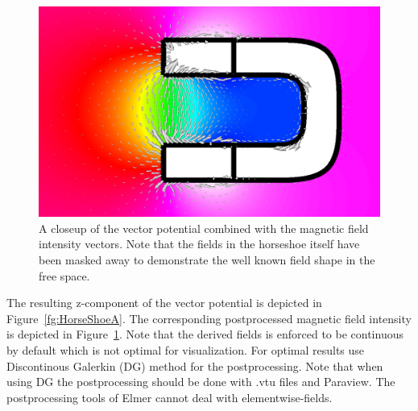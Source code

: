 \begin{figure}[h]
\centering
\includegraphics[width=120 mm]{HorseShoeB}
\caption{A closeup of the vector potential combined with the magnetic field intensity vectors. 
Note that the fields in the horseshoe itself have been
masked away to demonstrate the well known field shape in the free space.}\label{fg:HorseShoeB}
\end{figure}  


The resulting z-component of the vector potential is depicted in Figure~\ref{fg:HorseShoeA}.
The corresponding postprocessed magnetic field intensity is depicted in Figure~\ref{fg:HorseShoeB}. 
Note that the derived fields is enforced to be continuous by default which is not 
optimal for visualization. For optimal results use Discontinous Galerkin (DG) method
for the postprocessing. Note that when using DG the postprocessing should be done with .vtu files and 
Paraview. The postprocessing tools of Elmer cannot deal with elementwise-fields. 


\hfill



